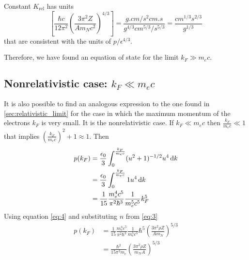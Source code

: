 \documentclass[a4paper]{article}
\begin{document}
Constant $K_{\mathrm{rel}}$ has units
\begin{equation}
    \left[\frac{\hbar c}{12 \pi ^2}\left(\frac{3\pi^2Z}{Am_Nc^2}\right)^{4/3}\right] = \frac{\unit{g.cm/s^2}\unit{cm.s}}{\unit{g^{4/3}cm^{5/3}/s^{5/3}}} = \frac{\unit{cm^{1/3}s^{2/3}}}{\unit{g^{1/3}}}
\end{equation}
that are consistent with the units of $p/\epsilon^{4/3}$.

Therefore, we have found an equation of state for the limit $k_F \gg m_ec$.

\subsection[Nonrelativistic case]{Nonrelativistic case: $k_F \ll m_ec$}

It is also possible to find an analogous expression to the one found in \ref{sec:relativistic_limit} for the case in which the maximum momentum of the electrons $k_F$ is very small. It is the nonrelativistic case. 
If $k_F\ll m_ec$ then $\frac{k_F}{m_ec}\ll1$ that implies $\left(\frac{k_F}{m_ec}\right)^2 + 1 \approx 1$. Then
\begin{equation}
\begin{split}
    p(k_F) &= \frac{\epsilon_0}{3}\int^{\frac{k_F}{m_ec}}_{0} (u^2+1)^{-1/2} u^4 \odif{k} \\
    & = \frac{\epsilon_0}{3}\int^{\frac{k_F}{m_ec}}_{0} 1 u^4 \odif{k}\\
    & = \frac{1}{15} \frac{m_e^4c^5}{\pi^2\hbar^3} \frac{1}{m_e^5c^5}k_F^5
\end{split}
\end{equation}
Using equation \eqref{eq:4} and substituting $n$ from \eqref{eq:3}
\begin{equation} \label{eq:6}
\begin{split}
    p(k_F) &= \frac{1}{15} \frac{m_e^4c^5}{\pi^2\hbar^3} \frac{1}{m_e^5c^5}\hbar^5\left(\frac{3\pi^2\rho Z}{Am_N}\right)^{5/3} \\
    &= \frac{\hbar^2 }{15 \pi ^2 m_e}\left(\frac{3\pi^2\rho Z}{m_NA}\right)^{5/3}
\end{split}
\end{equation}
\end{document}
